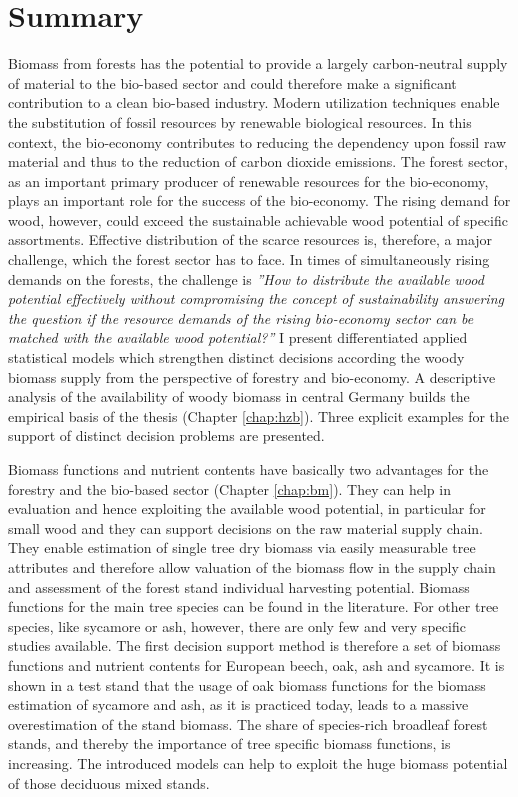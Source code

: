\chapter*{Summary}
\label{chap:Summary}
Biomass from forests has the potential to provide a largely carbon-neutral supply of material to the bio-based sector and could therefore make a significant contribution to a clean bio-based industry. Modern utilization techniques enable the substitution of fossil resources by renewable biological resources. In this context, the bio-economy contributes to reducing the dependency upon fossil raw material and thus to the reduction of carbon dioxide emissions. The forest sector, as an important primary producer of renewable resources for the bio-economy, plays an important role for the success of the bio-economy. The rising demand for wood, however, could exceed the sustainable achievable wood potential of specific assortments. Effective distribution of the scarce resources is, therefore, a major challenge, which the forest sector has to face. In times of simultaneously rising demands on the forests, the challenge is \textit{''How to distribute the available wood potential effectively without compromising the concept of sustainability answering the question if the resource demands of the rising bio-economy sector can be matched with the available wood potential?''} I present differentiated applied statistical models which strengthen distinct decisions according the woody biomass supply from the perspective of forestry and bio-economy. A descriptive analysis of the availability of woody biomass in central Germany builds the empirical basis of the thesis (Chapter \ref{chap:hzb}). Three explicit examples for the support of distinct decision problems are presented.

Biomass functions and nutrient contents have basically two advantages for the forestry and the bio-based sector (Chapter \ref{chap:bm}). They can help in evaluation and hence exploiting the available wood potential, in particular for small wood and they can support decisions on the raw material supply chain. They enable estimation of single tree dry biomass via easily measurable tree attributes and therefore allow valuation of the biomass flow in the supply chain and assessment of the forest stand individual harvesting potential. Biomass functions for the main tree species can be found in the literature. For other tree species, like sycamore or ash, however, there are only few and very specific studies available. The first decision support method is therefore a set of biomass functions and nutrient contents for European beech, oak, ash and sycamore. It is shown in a test stand that the usage of oak biomass functions for the biomass estimation of sycamore and ash, as it is practiced today, leads to a massive overestimation of the stand biomass. The share of species-rich broadleaf forest stands, and thereby the importance of tree specific biomass functions, is increasing. The introduced models can help to exploit the huge biomass potential of those deciduous mixed stands.

